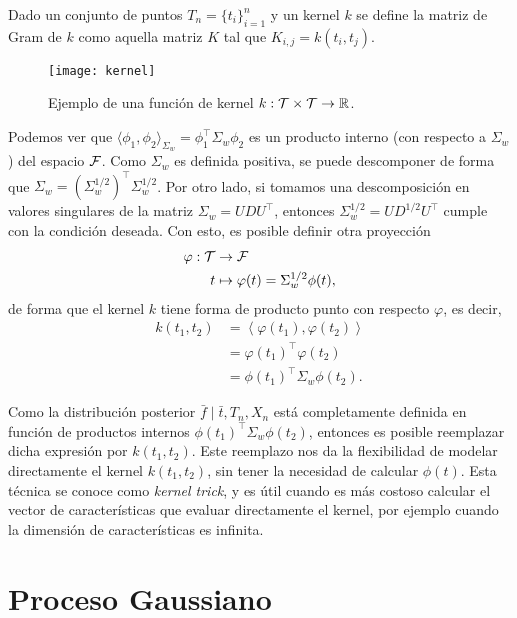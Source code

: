 \begin{definition}
	Dado un conjunto de puntos \(T_n = \{t_{i}\}_{i=1}^n\) y un kernel \(k\) se define la matriz de Gram de \(k\) como aquella matriz \(K\) tal que \(K_{i,j} = k(t_{i}, t_{j})\).
\end{definition}

\begin{figure}[h]
	\centering
	\texttt{[image: kernel]}
	\caption{Ejemplo de una función de kernel \(k : \mathcal{T} \times \mathcal{T} \to \mathbb{R}\).}
\end{figure}
Podemos ver que \(\langle \phi_{1}, \phi_{2} \rangle_{\Sigma_w} = \phi_{1}^{\top} \Sigma_w \phi_{2}\) es un producto interno (con respecto a \(\Sigma_w\)) del espacio \(\mathcal{F}\). Como \(\Sigma_w\) es definida positiva, se puede descomponer de forma que \(\Sigma_w = (\Sigma_w^{1/2})^{\top} \Sigma_w^{1/2}\). Por otro lado, si tomamos una descomposición en valores singulares de la matriz \(\Sigma_w = UDU^{\top}\), entonces \(\Sigma_w^{1/2} = UD^{1/2}U^{\top}\) cumple con la condición deseada. Con esto, es posible definir otra proyección
\begin{align*}
	\varphi : \mathcal{T}	& \to \mathcal{F}\\
	t						& \mapsto \varphi(t) = \Sigma_w^{1/2} \phi(t),
\end{align*}
de forma que el kernel \(k\) tiene forma de producto punto con respecto \(\varphi\), es decir,
\begin{align*}
	k(t_{1}, t_{2})	&= \left\langle \varphi(t_{1}), \varphi(t_{2}) \right\rangle\\
					&= \varphi(t_{1})^{\top} \varphi(t_{2})\\
					&= \phi(t_{1})^{\top} \Sigma_w \phi(t_{2}).
\end{align*}

Como la distribución posterior \(\bar{f} \mid \bar{t}, T_n, X_n\) está completamente definida en función de productos internos \(\phi(t_{1})^{\top} \Sigma_w \phi(t_{2})\), entonces es posible reemplazar dicha expresión por \(k(t_{1}, t_{2})\). Este reemplazo nos da la flexibilidad de modelar directamente el kernel \(k(t_{1}, t_{2})\), sin tener la necesidad de calcular \(\phi(t)\). Esta técnica se conoce como \emph{kernel trick}, y es útil cuando es más costoso calcular el vector de características que evaluar directamente el kernel, por ejemplo cuando la dimensión de características es infinita.

\section{Proceso Gaussiano}

